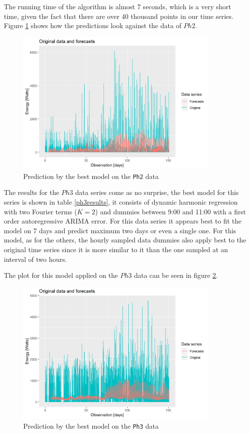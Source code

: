 \documentclass[12pt,a4paper,titlepage]{report}
\begin{document}
The running time of the algorithm is almost 7 seconds, which is a very short time, given the fact that there are over 40 thousand points in our time series. Figure \ref{dbestph2} shows how the predictions look against the data of $ Ph2 $.

\begin{figure}[h]
    \centering
    \includegraphics[width=0.9\textwidth]{dbestph2}
    \caption{Prediction by the best model on the \texttt{Ph2} data}
    \label{dbestph2}
\end{figure}

The results for the $ Ph3 $ data series come as no surprise, the best model for this series is shown in table \ref{ph3results}, it consists of dynamic harmonic regression with two Fourier terms ($ K = 2 $) and dummies between 9:00 and 11:00 with a first order autoregressive ARIMA error.
For this data series it appears best to fit the model on 7 days and predict maximum two days or even a single one. For this model, as for the others, the hourly sampled data dummies also apply best to the original time series since it is more similar to it than the one sampled at an interval of two hours.

The plot for this model applied on the $ Ph3 $ data can be seen in figure \ref{dbestph3}.

\begin{figure}[h]
    \centering
    \includegraphics[width=0.9\textwidth]{dbestph3}
    \caption{Prediction by the best model on the \texttt{Ph3} data}
    \label{dbestph3}
\end{figure}
\end{document}
